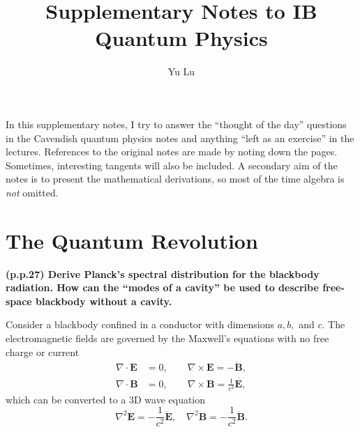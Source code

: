 \documentclass{article}
\title{Supplementary Notes to IB Quantum Physics}
\author{Yu Lu}
\begin{document}
\maketitle
In this supplementary notes, I try to answer the ``thought of the day'' questions in the Cavendish quantum physics notes and anything ``left as an exercise'' in the lectures. References to the original notes are made by noting down the pages. Sometimes, interesting tangents will also be included. A secondary aim of the notes is to present the mathematical derivations, so most of the time algebra is \textit{not} omitted. 
\section{The Quantum Revolution}
\begin{framed}
    \textbf{(p.p.27) Derive Planck's spectral distribution for the blackbody radiation. How can the ``modes of a cavity'' be used to describe free-space blackbody without a cavity. }
\end{framed}


Consider a blackbody confined in a conductor with dimensions $a,b,$ and $c$. The electromagnetic fields are governed by the Maxwell's equations with no free charge or current
\begin{align*}
    \nabla \cdot \mathbf{E} &= 0, \qquad \nabla \times \mathbf{E} = -\dot{\mathbf{B}}, \\
    \nabla \cdot \mathbf{B} &= 0, \qquad \nabla \times \mathbf{B} = \frac{1}{c^{2} } \dot{\mathbf{E},} 
\end{align*}
which can be converted to a 3D wave equation
\[
    \nabla ^{2} \mathbf{E} =-\frac{1}{c^{2} } \ddot{\mathbf{E} }, \quad 
    \nabla ^{2} \mathbf{B} =-\frac{1}{c^{2} } \ddot{\mathbf{B} }. 
\]
\end{document}
